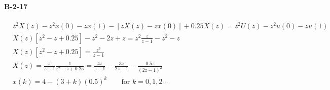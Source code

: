 {\paragraph{B-2-17} 
%
\begin{align*}
& z^2X(z)-z^2x(0)-zx(1)-[zX(z)-zx(0)]+0.25X(z)= z^2U(z)-z^2u(0)-zu(1) \\
& X(z)[z^2-z+0.25]-z^2-2z+z=z^2 \frac{z}{z-1}-z^2-z \\
& X(z)[z^2-z+0.25]=\frac{z^3}{z-1} \\
& X(z)=\frac{z^3}{z-1}\frac{1}{z^2-z+0.25}=\frac{4z}{z-1}-\frac{3z}{2z-1}-\frac{0.5z}{(2z-1)^2} \\
& x(k) = 4-(3+k)(0.5)^k \qquad \text{for } k = 0,1,2 \cdots
\end{align*}


}
